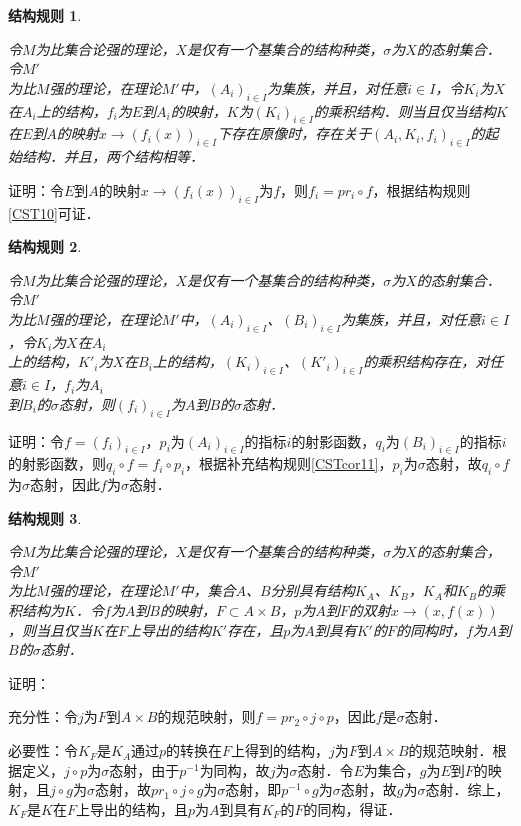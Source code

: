 \documentclass[12pt, a4paper, oneside]{book}
\newtheorem{CST}{结构规则}
\begin{document}
			\begin{CST}\label{CST15}
				\hfill\par
				令$M$为比集合论强的理论，$X$是仅有一个基集合的结构种类，$\sigma$为$X$的态射集合．令$M'$\\为比$M$强的理论，在理论$M'$中，$(A_i)_{i\in I}$为集族，并且，对任意$i\in I$，令$K_i$为$X$在$A_i$上的结构，$f_i$为$E$到$A_i$的映射，$K$为$(K_i)_{i\in I}$的乘积结构．则当且仅当结构$K$在$E$到$A$的映射$x\to (f_i(x))_{i\in I}$下存在原像时，存在关于$(A_i, K_i, f_i)_{i\in I}$的起始结构．并且，两个结构相等．
			\end{CST}
			证明：令$E$到$A$的映射$x\to (f_i(x))_{i\in I}$为$f$，则$f_i=pr_i\circ f$，根据结构规则\ref{CST10}可证．
			
			\begin{CST}\label{CST16}
				\hfill\par
				令$M$为比集合论强的理论，$X$是仅有一个基集合的结构种类，$\sigma$为$X$的态射集合．令$M'$\\为比$M$强的理论，在理论$M'$中，$(A_i)_{i\in I}$、$(B_i)_{i\in I}$为集族，并且，对任意$i\in I$，令$K_i$为$X$在$A_i$\\上的结构，${K'}_i$为$X$在$B_i$上的结构，$(K_i)_{i\in I}$、$({K'}_i)_{i\in I}$的乘积结构存在，对任意$i\in I$，$f_i$为$A_i$\\到$B_i$的$\sigma$态射，则$(f_i)_{i\in I}$为$A$到$B$的$\sigma$态射．
			\end{CST}
			证明：令$f=(f_i)_{i\in I}$，$p_i$为$(A_i)_{i\in I}$的指标$i$的射影函数，$q_i$为$(B_i)_{i\in I}$的指标$i$的射影函数，则$q_i\circ f=f_i\circ p_i$，根据补充结构规则\ref{CSTcor11}，$p_i$为$\sigma$态射，故$q_i\circ f$为$\sigma$态射，因此$f$为$\sigma$态射．
			
			\begin{CST}\label{CST17}
				\hfill\par
				令$M$为比集合论强的理论，$X$是仅有一个基集合的结构种类，$\sigma$为$X$的态射集合，令$M'$\\为比$M$强的理论，在理论$M'$中，集合$A$、$B$分别具有结构$K_A$、$K_B$，$K_A$和$K_B$的乘积结构为$K$．令$f$为$A$到$B$的映射，$F\subset A\times B$，$p$为$A$到$F$的双射$x\to (x, f(x))$，则当且仅当$K$在$F$上导出的结构$K'$存在，且$p$为$A$到具有$K'$的$F$的同构时，$f$为$A$到$B$的$\sigma$态射．
			\end{CST}
			证明：
			\par
			充分性：令$j$为$F$到$A\times B$的规范映射，则$f=pr_2\circ j\circ p$，因此$f$是$\sigma$态射．
			\par
			必要性：令$K_F$是$K_A$通过$p$的转换在$F$上得到的结构，$j$为$F$到$A\times B$的规范映射．根据定义，$j\circ p$为$\sigma$态射，由于$p^{-1}$为同构，故$j$为$\sigma$态射．令$E$为集合，$g$为$E$到$F$的映射，且$j\circ g$为$\sigma$态射，故$pr_1\circ j\circ g$为$\sigma$态射，即$p^{-1}\circ g$为$\sigma$态射，故$g$为$\sigma$态射．综上，$K_F$是$K$在$F$上导出的结构，且$p$为$A$到具有$K_F$的$F$的同构，得证．
			
\end{document}
